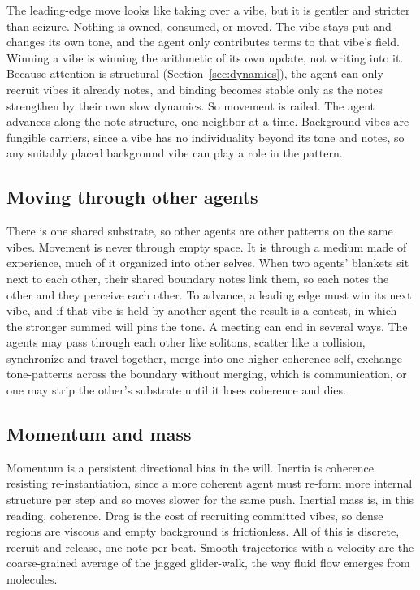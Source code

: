 The leading-edge move looks like taking over a vibe, but it is gentler and stricter than seizure. Nothing is owned, consumed, or moved. The vibe stays put and changes its own tone, and the agent only contributes terms to that vibe's field. Winning a vibe is winning the arithmetic of its own update, not writing into it. Because attention is structural (Section~\ref{sec:dynamics}), the agent can only recruit vibes it already notes, and binding becomes stable only as the notes strengthen by their own slow dynamics. So movement is railed. The agent advances along the note-structure, one neighbor at a time. Background vibes are fungible carriers, since a vibe has no individuality beyond its tone and notes, so any suitably placed background vibe can play a role in the pattern.

\subsection{Moving through other agents}

There is one shared substrate, so other agents are other patterns on the same vibes. Movement is never through empty space. It is through a medium made of experience, much of it organized into other selves. When two agents' blankets sit next to each other, their shared boundary notes link them, so each notes the other and they perceive each other. To advance, a leading edge must win its next vibe, and if that vibe is held by another agent the result is a contest, in which the stronger summed will pins the tone. A meeting can end in several ways. The agents may pass through each other like solitons, scatter like a collision, synchronize and travel together, merge into one higher-coherence self, exchange tone-patterns across the boundary without merging, which is communication, or one may strip the other's substrate until it loses coherence and dies.

\subsection{Momentum and mass}

Momentum is a persistent directional bias in the will. Inertia is coherence resisting re-instantiation, since a more coherent agent must re-form more internal structure per step and so moves slower for the same push. Inertial mass is, in this reading, coherence. Drag is the cost of recruiting committed vibes, so dense regions are viscous and empty background is frictionless. All of this is discrete, recruit and release, one note per beat. Smooth trajectories with a velocity are the coarse-grained average of the jagged glider-walk, the way fluid flow emerges from molecules.
